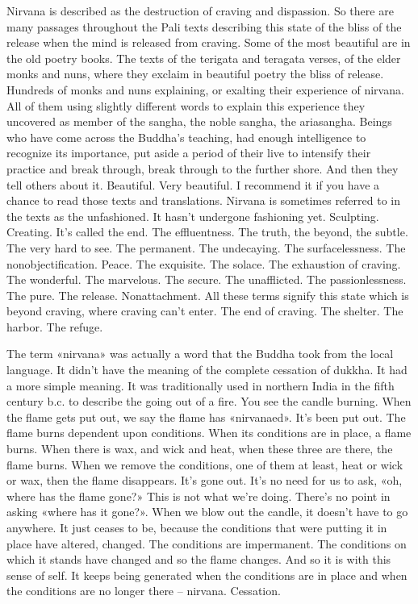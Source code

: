 \documentclass[letterpaper,10pt,english]{sphinxmanual}
\begin{document}
\sphinxAtStartPar
Nirvana is described as the destruction of craving and dispassion. So
  there  are  many  passages  throughout  the  Pali  texts  describing  this  state  of
the bliss of the release when the mind is released from craving. Some of the
most beautiful are in the old poetry books. The texts of the terigata and teragata verses, of the elder monks and nuns, where they exclaim in beautiful
poetry the bliss of release. Hundreds of monks and nuns explaining, or exalting their experience of nirvana. All of them using slightly different words to
explain this experience they uncovered as member of the sangha, the noble
sangha, the aria\sphinxhyphen{}sangha. Beings who have come across the Buddha’s teaching, had enough intelligence to recognize its importance, put aside a period
of their live to intensify their practice and break through, break through to
the further shore. And then they tell others about it. Beautiful. Very beautiful. I recommend it if you have a chance to read those texts and translations.
Nirvana  is  sometimes  referred  to  in  the  texts  as  the  unfashioned.  It
hasn’t  undergone  fashioning  yet.  Sculpting.  Creating.  It’s  called  the  end.
The effluentness. The truth, the beyond, the subtle. The very hard to see. The
permanent.  The  undecaying.  The  surfacelessness.  The  non\sphinxhyphen{}objectification.
Peace. The exquisite. The solace. The exhaustion of craving. The wonderful. The marvelous. The secure. The unafflicted. The passionlessness. The
pure. The release. Non\sphinxhyphen{}attachment. All these terms signify this state which is
beyond craving, where craving can’t enter. The end of craving. The shelter.
The harbor. The refuge.

\sphinxAtStartPar
The  term  «nirvana»  was  actually  a  word  that  the  Buddha  took  from
the local language. It didn’t have the meaning of the complete cessation of
dukkha. It had a more simple meaning. It was traditionally used in northern
India in the fifth century b.c. to describe the going out of a fire. You see the
candle burning. When the flame gets put out, we say the flame has «nirvanaed». It’s been put out. The flame burns dependent upon conditions. When its
conditions are in place, a flame burns. When there is wax, and wick and heat,
when these three are there, the flame burns. When we remove the conditions,
one of them at least, heat or wick or wax, then the flame disappears. It’s gone
out. It’s no need for us to ask, «oh, where has the flame gone?» This is not
what we’re doing. There’s no point in asking «where has it gone?». When
we blow out the candle, it doesn’t have to go anywhere. It just ceases to be,
because the conditions that were putting it in place have altered, changed.
  The  conditions  are  impermanent.  The  conditions  on  which  it  stands  have
changed  and  so  the  flame  changes. And  so  it  is  with  this  sense  of  self.  It
keeps being generated when the conditions are in place and when the conditions are no longer there – nirvana. Cessation.
\end{document}
